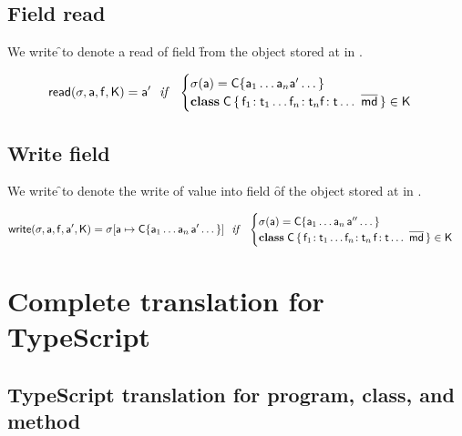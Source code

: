 \documentclass[a4paper,USenglish]{tex/lipics-v2016}
\begin{document}
\subsection{Field read}

We write \readf\s\a\f\K to denote a read of field \f from the object
stored at \a in \s.

\begin{equation*}
\readf \s\a\f\K = \ap 
  ~~\mathit{if}~~ \begin{cases}  \s(\a) = \obj\C{\a_1\dots\a_n \ap \dots}\\
 \Class\C {\Fdef{\f_1}{\t_1}\dots\Fdef{\f_n}{\t_n}\Ftype\f\t\dots}{\b\md}\in\K
 \end{cases}
\end{equation*}

\subsection{Write field}

We write \setf\s\a\f\ap\K to denote the write of value \ap into field \f of
the object stored at \a in \s.

\begin{equation*}
\setf \s\a\f\ap\K= \Map\s{\Bind{\a}{\obj\C{\a_1\dots\a_n\,\ap\dots}}}
  ~~\mathit{if}~~ \begin{cases}
   \s(\a) = \obj\C{\a_1\dots\a_n\,\app\dots}\\
   \Class\C{\Fdef{\f_1}{\t_1}\dots\Fdef{\f_n}{\t_n}\,\Fdef\f\t\dots}{\b\md}\in\K
\end{cases}
\end{equation*}


\section{Complete translation for TypeScript}

\subsection{TypeScript translation for program, class, and method}

\begin{mathpar}



\end{mathpar}
\end{document}
